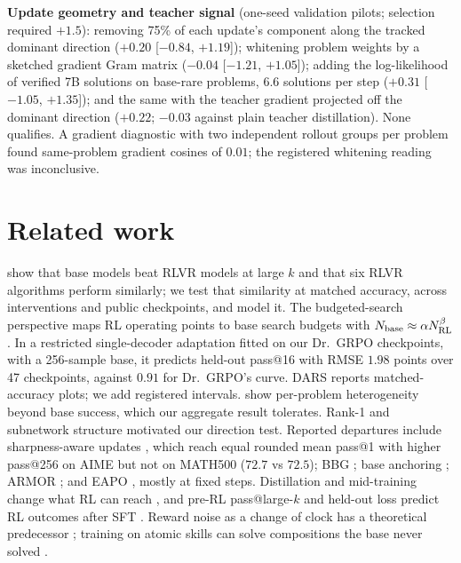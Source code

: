 \documentclass{article}
\theoremstyle{plain}
\begin{document}
\textbf{Update geometry and teacher signal} (one-seed validation pilots; selection required $+1.5$): removing 75\% of each update's component along the tracked dominant direction ($+0.20$ [$-0.84$, $+1.19$]); whitening problem weights by a sketched gradient Gram matrix ($-0.04$ [$-1.21$, $+1.05$]); adding the log-likelihood of verified 7B solutions on base-rare problems, 6.6 solutions per step ($+0.31$ [$-1.05$, $+1.35$]); and the same with the teacher gradient projected off the dominant direction ($+0.22$; $-0.03$ against plain teacher distillation). None qualifies. A gradient diagnostic with two independent rollout groups per problem found same-problem gradient cosines of $0.01$; the registered whitening reading was inconclusive.

\section{Related work}\label{sec:related}
\citet{yue2025limit} show that base models beat RLVR models at large $k$ and that six RLVR algorithms perform similarly; we test that similarity at matched accuracy, across interventions and public checkpoints, and model it. The budgeted-search perspective \citep{sun2026boptr} maps RL operating points to base search budgets with $N_{\rm base}\approx\alpha N_{\rm RL}^\beta$. In a restricted single-decoder adaptation fitted on our Dr.\ GRPO checkpoints, with a 256-sample base, it predicts held-out pass@16 with RMSE $1.98$ points over 47 checkpoints, against $0.91$ for Dr.\ GRPO's curve. DARS \citep{yang2025depth} reports matched-accuracy plots; we add registered intervals. \citet{yang2026kernel} show per-problem heterogeneity beyond base success, which our aggregate result tolerates. Rank-1 and subnetwork structure \citep{cai2025alpharl,wei2026relex,mukherjee2025subnetworks} motivated our direction test. Reported departures include sharpness-aware updates \citep{kim2026flat}, which reach equal rounded mean pass@1 with higher pass@256 on AIME but not on MATH500 ($72.7$ vs $72.5$); BBG \citep{yuan2026overtraining}; base anchoring \citep{zhou2026pba}; ARMOR \citep{huang2026armor}; and EAPO \citep{lu2026eapo}, mostly at fixed steps. Distillation and mid-training change what RL can reach \citep{kim2025rlvsdistill,wang2025octothinker,zhang2025interplay,deshmukh2026projected}, and pre-RL pass@large-$k$ and held-out loss predict RL outcomes after SFT \citep{kang2025quagmires,malladi2026tailsft}. Reward noise as a change of clock has a theoretical predecessor \citep{rad2026rate}; training on atomic skills can solve compositions the base never solved \citep{wang2026primitives}.
\end{document}
